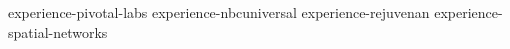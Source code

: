 {experience-pivotal-labs}
{experience-nbcuniversal}
{experience-rejuvenan}
{experience-spatial-networks}
